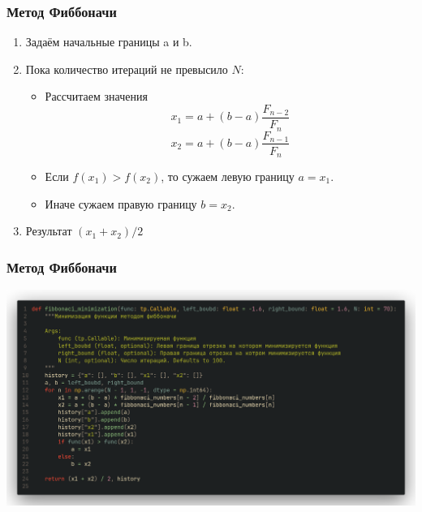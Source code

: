 \documentclass[9pt]{beamer}
\begin{document}
\begin{frame}
    \frametitle{Метод Фиббоначи}
            \begin{enumerate}
            \item Задаём начальные границы a и b. 
            \item Пока количество итераций не превысило $N$:
            \begin{itemize}
                \item  Рассчитаем значения 
                $$
                    x_1 = a + (b - a) \frac{F_{n - 2}}{F_{n}}
                $$
                $$
                  x_2 = a + (b - a) \frac{F_{n - 1}}{F_{n}}
                $$
                \item Если $f(x_1) > f(x_2)$, то сужаем левую границу $a = x_1$.
                \item Иначе сужаем правую границу $b = x_2$.
            \end{itemize}
            \item Результат $(x_1 + x_2) / 2$
            
        \end{enumerate}    
\end{frame}

\begin{frame}
    \frametitle{Метод Фиббоначи}
    \begin{center}
        \includegraphics[width = 1\textwidth]{code_fibb.png}    
    \end{center}
    
\end{frame}
\end{document}
